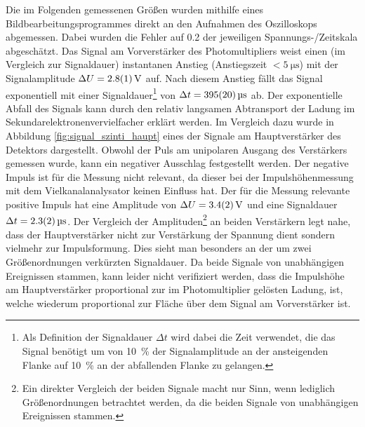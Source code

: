 \documentclass[11pt, a4paper]{article}
\numberwithin{equation}{section}
\begin{document}
Die im Folgenden gemessenen Größen wurden mithilfe eines Bildbearbeitungsprogrammes direkt an den Aufnahmen des Oszilloskops abgemessen.
Dabei wurden die Fehler auf \SI{0.2}{\division} der jeweiligen Spannungs-/Zeitskala abgeschätzt.
Das Signal am Vorverstärker des Photomultipliers weist einen (im Vergleich zur Signaldauer) instantanen Anstieg (Anstiegszeit $< \SI{5}{\micro\second}$) mit der Signalamplitude $\Delta U = \SI{2.8 +- 0.1}{\volt}$ auf.
Nach diesem Anstieg fällt das Signal exponentiell mit einer Signaldauer\footnote{Als Definition der Signaldauer $\Delta t$ wird dabei die Zeit verwendet, die das Signal benötigt um von \SI{10}{\percent} der Signalamplitude an der ansteigenden Flanke auf \SI{10}{\percent} an der abfallenden Flanke zu gelangen.} von $\Delta t = \SI{395 +- 20}{\micro\second}$ ab.
Der exponentielle Abfall des Signals kann durch den relativ langsamen Abtransport der Ladung im Sekundarelektronenvervielfacher erklärt werden.
Im Vergleich dazu wurde in Abbildung \ref{fig:signal_szinti_haupt} eines der Signale am Hauptverstärker des Detektors dargestellt.
Obwohl der Puls am unipolaren Ausgang des Verstärkers gemessen wurde, kann ein negativer Ausschlag festgestellt werden.
Der negative Impuls ist für die Messung nicht relevant, da dieser bei der Impulshöhenmessung mit dem Vielkanalanalysator keinen Einfluss hat.
Der für die Messung relevante positive Impuls hat eine Amplitude von $\Delta U = \SI{3.4 +- 0.2}{\volt}$ und eine Signaldauer $\Delta t = \SI{2.3 +- 0.2}{\micro\second}$.
Der Vergleich der Amplituden\footnote{Ein direkter Vergleich der beiden Signale macht nur Sinn, wenn lediglich Größenordnungen betrachtet werden, da die beiden Signale von unabhängigen Ereignissen stammen.} an beiden Verstärkern legt nahe, dass der Hauptverstärker nicht zur Verstärkung der Spannung dient sondern vielmehr zur Impulsformung.
Dies sieht man besonders an der um zwei Größenordnungen verkürzten Signaldauer.
Da beide Signale von unabhängigen Ereignissen stammen, kann leider nicht verifiziert werden, dass die Impulshöhe am Hauptverstärker proportional zur im Photomultiplier gelösten Ladung, ist, welche wiederum proportional zur Fläche über dem Signal am Vorverstärker ist.
\end{document}
